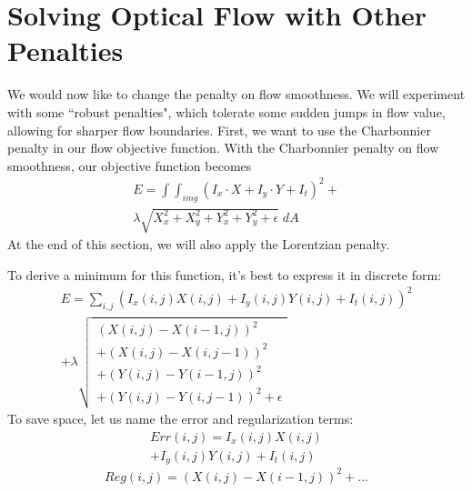 \documentclass[10pt,twocolumn,letterpaper]{article}
\begin{document}
\section{Solving Optical Flow with Other Penalties}
We would now like to change the penalty on flow smoothness.  We will experiment with some ``robust penalties", which tolerate some sudden jumps in flow value, allowing for sharper flow boundaries.  First, we want to use the Charbonnier penalty in our flow objective function.  With the Charbonnier penalty on flow smoothness, our objective function becomes
\begin{multline} \label{eq:objectivec}
E = \int \int_{img} (I_x \cdot X + I_y \cdot Y + I_t)^2 + \\
\lambda \sqrt{X_x^2 + X_y^2 + Y_x^2 + Y_y^2 + \epsilon} \; dA 
\end{multline}
At the end of this section, we will also apply the Lorentzian penalty.

To derive a minimum for this function, it's best to express it in discrete form:
\begin{multline} \label{eq:objectivecDiscrete}
E = \sum_{i,j} (I_x(i, j) X(i, j) + I_y(i, j) Y(i, j) + I_t(i, j))^2 \\
+ \lambda \sqrt{
\begin{array}{c}
(X(i, j) - X(i-1, j))^2 \\
+ (X(i,j) - X(i,j-1))^2 \\
+ (Y(i,j) - Y(i-1, j))^2 \\
+ (Y(i,j) - Y(i,j-1))^2 + \epsilon
\end{array}
}
\end{multline}
To save space, let us name the error and regularization terms:
\begin{multline} \label{eq:errorTerm}
Err(i, j) = I_x(i, j) X(i, j) \\
+ I_y(i, j) Y(i, j) + I_t(i, j)
\end{multline}
\begin{equation} \label{eq:regTerm}
Reg(i,j) = (X(i,j) - X(i-1,j))^2 + ...
\end{equation}
\end{document}
